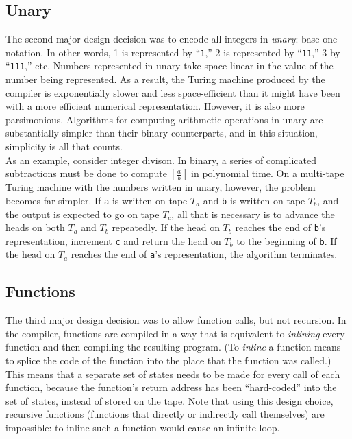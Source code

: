 \documentclass[11pt]{report}
\begin{document}
\subsection{Unary}

The second major design decision was to encode all integers in \emph{unary}: base-one notation. In other words, 1 is represented by ``\texttt{1},'' 2 is represented by ``\texttt{11},'' 3 by ``\texttt{111},'' etc. Numbers represented in unary take space linear in the value of the number being represented. As a result, the Turing machine produced by the compiler is exponentially slower and less space-efficient than it might have been with a more efficient numerical representation. However, it is also more parsimonious. Algorithms for computing arithmetic operations in unary are substantially simpler than their binary counterparts, and in this situation, simplicity is all that counts. \\

As an example, consider integer divison. In binary, a series of complicated subtractions must be done to compute $\left \lfloor{\frac{a}{b}}\right \rfloor$ in polynomial time. On a multi-tape Turing machine with the numbers written in unary, however, the problem becomes far simpler. If \texttt{a} is written on tape $T_a$ and \texttt{b} is written on tape $T_b$, and the output is expected to go on tape $T_c$, all that is necessary is to advance the heads on both $T_a$ and $T_b$ repeatedly. If the head on $T_b$ reaches the end of \texttt{b}'s representation, increment \texttt{c} and return the head on $T_b$ to the beginning of \texttt{b}. If the head on $T_a$ reaches the end of \texttt{a}'s representation, the algorithm terminates. \\

\subsection{Functions \label{sec:functions}}

The third major design decision was to allow function calls, but not recursion. In the compiler, functions are compiled in a way that is equivalent to \emph{inlining} every function and then compiling the resulting program. (To \emph{inline} a function means to splice the code of the function into the place that the function was called.) This means that a separate set of states needs to be made for every call of each function, because the function's return address has been ``hard-coded'' into the set of states, instead of stored on the tape. Note that using this design choice, recursive functions (functions that directly or indirectly call themselves) are impossible: to inline such a function would cause an infinite loop. \\
\end{document}
